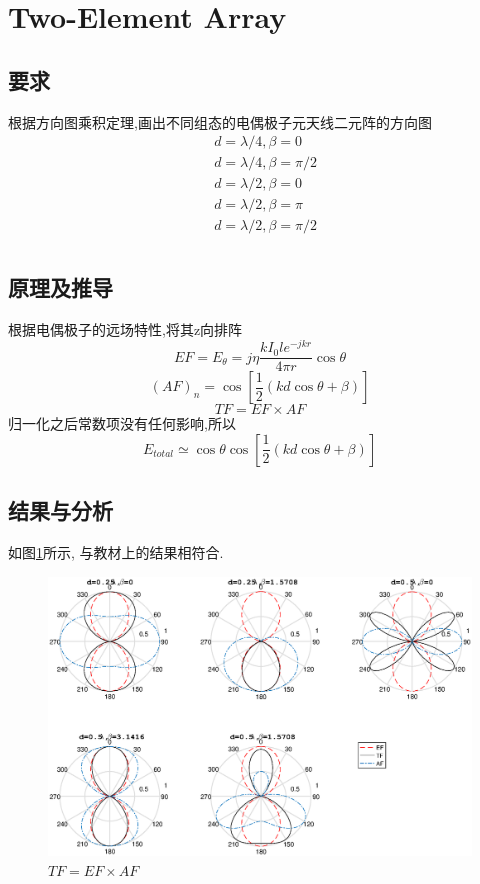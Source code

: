 


\section{Two-Element Array}
\subsection{要求}
\noindent 根据方向图乘积定理,画出不同组态的电偶极子元天线二元阵的方向图
\begin{align*}
&d=\lambda/4, \beta=0\\
&d=\lambda/4, \beta=\pi/2\\
&d=\lambda/2, \beta=0\\
&d=\lambda/2, \beta=\pi\\
&d=\lambda/2, \beta=\pi/2\\
\end{align*}	

\subsection{原理及推导}
根据电偶极子的远场特性,将其z向排阵
\begin{equation}
EF=E_\theta=j\eta\dfrac{kI_0le^{-jkr}}{4\pi r}\cos\theta
\end{equation}
\begin{equation}
(AF)_n=\cos\left[\dfrac{1}{2}(kd\cos\theta+\beta)\right]
\end{equation}
\begin{equation*}
TF=EF\times AF
\end{equation*}
归一化之后常数项没有任何影响,所以
\begin{equation}
E_{total}\simeq \cos\theta\cos\left[\dfrac{1}{2}(kd\cos\theta+\beta)\right]
\end{equation}
\subsection{结果与分析}
如图\ref{fig:2element}所示, 与教材上的结果相符合. 
\begin{figure}[!ht]
	\centering
	\includegraphics[width=\textwidth]{array2element.eps}
	\caption{$TF=EF\times AF$} \label{fig:2element}
\end{figure}
\newpage
